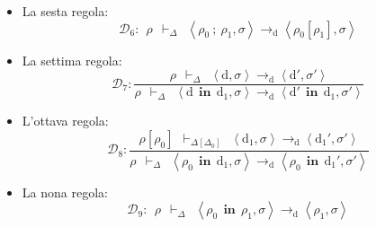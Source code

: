 \documentclass[a4paper]{article}
\begin{document}
\begin{itemize}
 		\item La sesta regola:
 		\begin{equation*}
 			\mathcal{D}_{6} : \:\: \rho \:\: \vdash_{\Delta} \:\: \left\langle \rho_{0} \: \mathbf{;} \: \rho_{1}, \sigma \right\rangle \rightarrow_{\mathrm{d}} \left\langle \rho_{0} \left[\rho_{1}\right], \sigma \right\rangle
 		\end{equation*}
 	
 		\item La settima regola:
 		\begin{equation*}
 			\mathcal{D}_{7} : \dfrac{
 				\rho \:\: \vdash_{\Delta} \:\: \left\langle \mathrm{d}, \sigma \right\rangle \rightarrow_{\mathrm{d}} \left\langle \mathrm{d}', \sigma' \right\rangle
 			}{
 				\rho \:\: \vdash_{\Delta} \:\: \left\langle \mathrm{d} \:\: \mathbf{in} \:\: \mathrm{d}_{1}, \sigma \right\rangle \rightarrow_{\mathrm{d}} \left\langle \mathrm{d}' \:\: \mathbf{in} \:\: \mathrm{d}_{1}, \sigma' \right\rangle
 			}
 		\end{equation*}
 	
 		\item L'ottava regola:
 		\begin{equation*}
 			\mathcal{D}_{8} : \dfrac{
 				\rho\left[\rho_{0}\right] \:\: \vdash_{\Delta\left[\Delta_{0}\right]} \:\: \left\langle \mathrm{d}_{1}, \sigma \right\rangle \rightarrow_{\mathrm{d}} \left\langle \mathrm{d}_{1}', \sigma' \right\rangle
 			}{
 				\rho \:\: \vdash_{\Delta} \:\: \left\langle \rho_{0} \:\: \mathbf{in} \:\: \mathrm{d}_{1}, \sigma \right\rangle \rightarrow_{\mathrm{d}} \left\langle \rho_{0} \:\: \mathbf{in} \:\: \mathrm{d}_{1}', \sigma' \right\rangle
 			}
 		\end{equation*}
 	
 		\item La nona regola:
 		\begin{equation*}
 			\mathcal{D}_{9} : \:\: \rho \:\: \vdash_{\Delta} \:\: \left\langle \rho_{0} \:\: \mathbf{in} \:\: \rho_{1}, \sigma \right\rangle \rightarrow_{\mathrm{d}} \left\langle \rho_{1}, \sigma \right\rangle
 		\end{equation*}\newpage
 	

\end{itemize}
\end{document}
